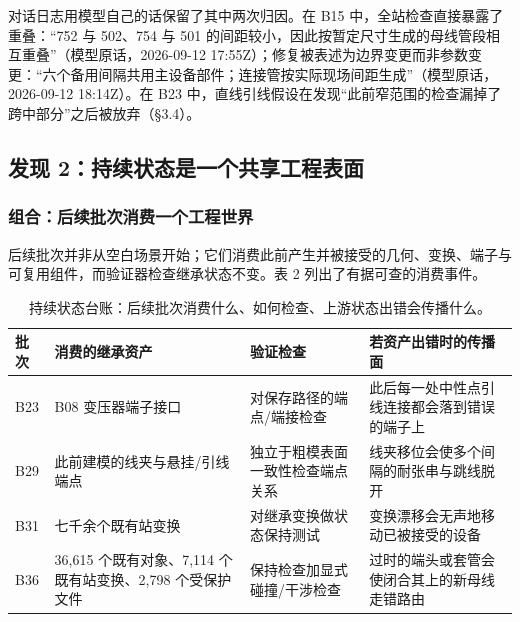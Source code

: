 \documentclass[10pt,a4paper]{article}
\begin{document}
对话日志用模型自己的话保留了其中两次归因。在 B15
中，全站检查直接暴露了重叠：``752 与 502、754 与 501
的间距较小，因此按暂定尺寸生成的母线管段相互重叠''（模型原话，2026-09-12
17:55Z）；修复被表述为边界变更而非参数变更：``六个备用间隔共用主设备部件；连接管按实际现场间距生成''（模型原话，2026-09-12
18:14Z）。在 B23
中，直线引线假设在发现``此前窄范围的检查漏掉了跨中部分''之后被放弃（§3.4）。

\hypertarget{ux53d1ux73b0-2ux6301ux7eedux72b6ux6001ux662fux4e00ux4e2aux5171ux4eabux5de5ux7a0bux8868ux9762}{%
\subsection{发现
2：持续状态是一个共享工程表面}\label{ux53d1ux73b0-2ux6301ux7eedux72b6ux6001ux662fux4e00ux4e2aux5171ux4eabux5de5ux7a0bux8868ux9762}}

\hypertarget{ux7ec4ux5408ux540eux7eedux6279ux6b21ux6d88ux8d39ux4e00ux4e2aux5de5ux7a0bux4e16ux754c}{%
\subsubsection{组合：后续批次消费一个工程世界}\label{ux7ec4ux5408ux540eux7eedux6279ux6b21ux6d88ux8d39ux4e00ux4e2aux5de5ux7a0bux4e16ux754c}}

后续批次并非从空白场景开始；它们消费此前产生并被接受的几何、变换、端子与可复用组件，而验证器检查继承状态不变。表
2 列出了有据可查的消费事件。

\begin{table}[t]
\centering
\caption{持续状态台账：后续批次消费什么、如何检查、上游状态出错会传播什么。}
\label{tab:ledger}
\small
\setlength{\tabcolsep}{5pt}
\renewcommand{\arraystretch}{1.12}
\begin{tabularx}{\textwidth}{@{}p{}p{}XX@{}}
\toprule
\textbf{批次} & \textbf{消费的继承资产} & \textbf{验证检查} & \textbf{若资产出错时的传播面} \\
\midrule
B23 & B08 变压器端子接口 & 对保存路径的端点/端接检查 & 此后每一处中性点引线连接都会落到错误的端子上 \\
B29 & 此前建模的线夹与悬挂/引线端点 & 独立于粗模表面一致性检查端点关系 & 线夹移位会使多个间隔的耐张串与跳线脱开 \\
B31 & 七千余个既有站变换 & 对继承变换做状态保持测试 & 变换漂移会无声地移动已被接受的设备 \\
B36 & 36,615 个既有对象、7,114 个既有站变换、2,798 个受保护文件 & 保持检查加显式碰撞/干涉检查 & 过时的端头或套管会使闭合其上的新母线走错路由 \\
\bottomrule
\end{tabularx}
\end{table}
\end{document}
